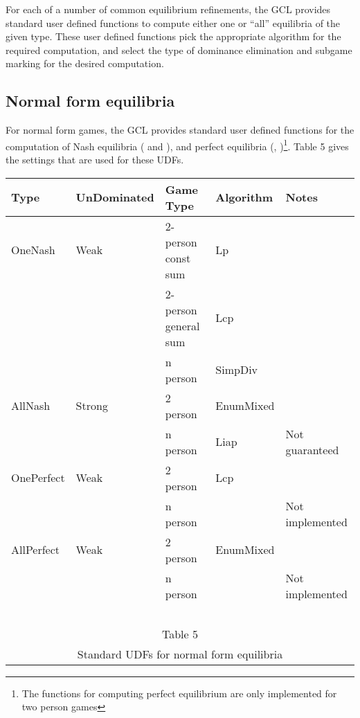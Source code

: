 For each of a number of common equilibrium refinements, the GCL
provides standard user defined functions to compute either one or ``all''
equilibria of the given type.  These user defined functions pick the
appropriate algorithm for the required computation, and select the
type of dominance elimination and subgame marking for the desired
computation.

\subsection{Normal form equilibria}

For normal form games, the GCL provides standard user defined
functions for the computation of Nash equilibria ( and ), and perfect
equilibria (, )\footnote{The
functions for computing perfect equilibrium are only implemented for
two person games}.  Table 5 gives the settings that are used for these
UDFs.

\medskip
\begin{center}
\begin{tabular}{|l|l|p{2cm}|l|l|}
\hline
Type & UnDominated & Game Type & Algorithm & Notes \\
\hline
OneNash & Weak & 2-person const sum & Lp & \\ \cline{3-5}
        &      & 2-person general  sum & Lcp& \\ \cline{3-5}
        &      & n person              & SimpDiv & \\
\hline
AllNash & Strong & 2 person       & EnumMixed & \\ \cline{3-5}
        &        & n person       & Liap      & Not guaranteed\\
\hline
\hline
OnePerfect & Weak & 2 person     & Lcp    & \\ \cline{3-5}
           &        & n person     &     &Not implemented  \\
\hline
AllPerfect & Weak & 2 person      & EnumMixed & \\ \cline{3-5}
           &        & n person      &     & Not implemented\\
\hline
\multicolumn{5}{c}{\ }\\
\multicolumn{5}{c}{Table 5}\\
\multicolumn{5}{c}{Standard UDFs for normal form equilibria}\\
\end{tabular}
\end{center}
\medskip

